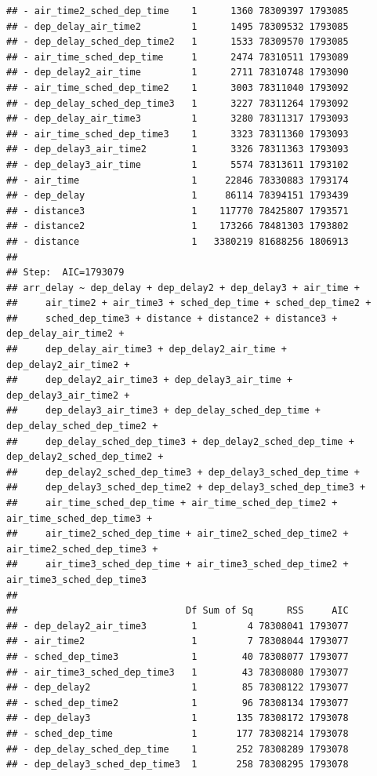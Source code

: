 \documentclass[
]{article}
\begin{document}
\begin{verbatim}
## - air_time2_sched_dep_time    1      1360 78309397 1793085
## - dep_delay_air_time2         1      1495 78309532 1793085
## - dep_delay_sched_dep_time2   1      1533 78309570 1793085
## - air_time_sched_dep_time     1      2474 78310511 1793089
## - dep_delay2_air_time         1      2711 78310748 1793090
## - air_time_sched_dep_time2    1      3003 78311040 1793092
## - dep_delay_sched_dep_time3   1      3227 78311264 1793092
## - dep_delay_air_time3         1      3280 78311317 1793093
## - air_time_sched_dep_time3    1      3323 78311360 1793093
## - dep_delay3_air_time2        1      3326 78311363 1793093
## - dep_delay3_air_time         1      5574 78313611 1793102
## - air_time                    1     22846 78330883 1793174
## - dep_delay                   1     86114 78394151 1793439
## - distance3                   1    117770 78425807 1793571
## - distance2                   1    173266 78481303 1793802
## - distance                    1   3380219 81688256 1806913
## 
## Step:  AIC=1793079
## arr_delay ~ dep_delay + dep_delay2 + dep_delay3 + air_time + 
##     air_time2 + air_time3 + sched_dep_time + sched_dep_time2 + 
##     sched_dep_time3 + distance + distance2 + distance3 + dep_delay_air_time2 + 
##     dep_delay_air_time3 + dep_delay2_air_time + dep_delay2_air_time2 + 
##     dep_delay2_air_time3 + dep_delay3_air_time + dep_delay3_air_time2 + 
##     dep_delay3_air_time3 + dep_delay_sched_dep_time + dep_delay_sched_dep_time2 + 
##     dep_delay_sched_dep_time3 + dep_delay2_sched_dep_time + dep_delay2_sched_dep_time2 + 
##     dep_delay2_sched_dep_time3 + dep_delay3_sched_dep_time + 
##     dep_delay3_sched_dep_time2 + dep_delay3_sched_dep_time3 + 
##     air_time_sched_dep_time + air_time_sched_dep_time2 + air_time_sched_dep_time3 + 
##     air_time2_sched_dep_time + air_time2_sched_dep_time2 + air_time2_sched_dep_time3 + 
##     air_time3_sched_dep_time + air_time3_sched_dep_time2 + air_time3_sched_dep_time3
## 
##                              Df Sum of Sq      RSS     AIC
## - dep_delay2_air_time3        1         4 78308041 1793077
## - air_time2                   1         7 78308044 1793077
## - sched_dep_time3             1        40 78308077 1793077
## - air_time3_sched_dep_time3   1        43 78308080 1793077
## - dep_delay2                  1        85 78308122 1793077
## - sched_dep_time2             1        96 78308134 1793077
## - dep_delay3                  1       135 78308172 1793078
## - sched_dep_time              1       177 78308214 1793078
## - dep_delay_sched_dep_time    1       252 78308289 1793078
## - dep_delay3_sched_dep_time3  1       258 78308295 1793078

\end{verbatim}
\end{document}
